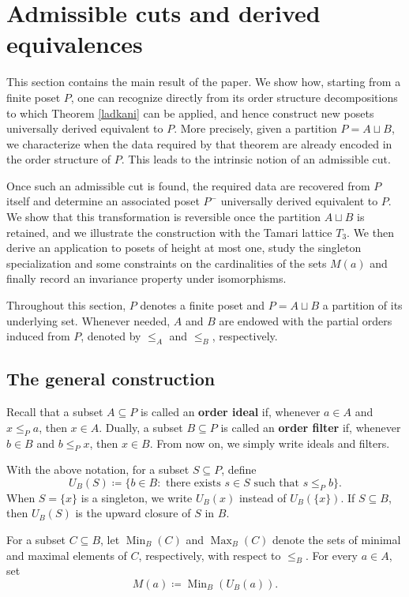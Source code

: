 \section{Admissible cuts and derived equivalences}

This section contains the main result of the paper. We show how, starting from a finite poset $P$, one can recognize directly from its order structure decompositions to which Theorem \ref{ladkani} can be applied, and hence construct new posets universally derived equivalent to $P$. More precisely, given a partition $P=A \sqcup B$, we characterize when the data required by that theorem are already encoded in the order structure of $P$. This leads to the intrinsic notion of an admissible cut.

Once such an admissible cut is found, the required data are recovered from $P$ itself and determine an associated poset $P^-$ universally derived equivalent to $P$. We show that this transformation is reversible once the partition $A \sqcup B$ is retained, and we illustrate the construction with the Tamari lattice $T_3$. We then derive an application to posets of height at most one, study the singleton specialization and some constraints on the cardinalities of the sets $M(a)$ and finally record an invariance property under isomorphisms. 

Throughout this section, $P$ denotes a finite poset and $P=A \sqcup B$ a partition of its underlying set. Whenever needed, $A$ and $B$ are endowed with the partial orders induced from $P$, denoted by $\leq_A$ and $\leq_B$, respectively.

\subsection{The general construction}

Recall that a subset $A \subseteq P$ is called an \textbf{order ideal} if, whenever $a \in A$ and $ x \leq_P a $, then $ x \in A$. Dually, a subset $B \subseteq P$ is called an \textbf{order filter} if, whenever $b \in B $ and $ b \leq_P x$, then $x \in B$. From now on, we simply write ideals and filters.

With the above notation, for a subset $S \subseteq P$, define
\[U_B(S) \coloneq \{b \in B \colon \text{ there exists } s \in S \text{ such that } s \leq_Pb\}.\] When $S=\{x\}$ is a singleton, we write $U_B(x)$ instead of $U_B(\{x\})$. If $S \subseteq B$, then $U_B(S)$ is the upward closure of $S$ in $B$.

For a subset $C \subseteq B$, let $\operatorname{Min}_B(C)$ and $\operatorname{Max}_B(C)$ denote the sets of minimal and maximal elements of $C$, respectively, with respect to $\leq_B$. For every $a \in A$, set
\[M(a) \coloneq \operatorname{Min}_B(U_B(a)).\]

